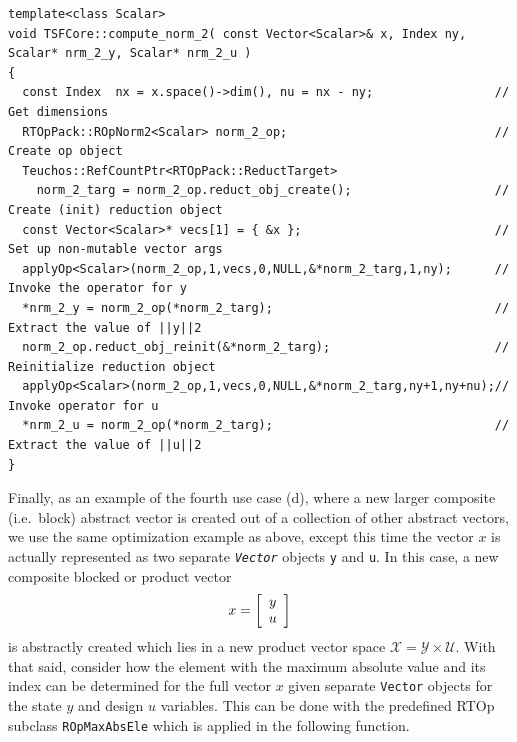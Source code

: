 {\scriptsize\begin{verbatim}
template<class Scalar>
void TSFCore::compute_norm_2( const Vector<Scalar>& x, Index ny, Scalar* nrm_2_y, Scalar* nrm_2_u )
{
  const Index  nx = x.space()->dim(), nu = nx - ny;                 // Get dimensions
  RTOpPack::ROpNorm2<Scalar> norm_2_op;                             // Create op object
  Teuchos::RefCountPtr<RTOpPack::ReductTarget>
    norm_2_targ = norm_2_op.reduct_obj_create();                    // Create (init) reduction object
  const Vector<Scalar>* vecs[1] = { &x };                           // Set up non-mutable vector args
  applyOp<Scalar>(norm_2_op,1,vecs,0,NULL,&*norm_2_targ,1,ny);      // Invoke the operator for y
  *nrm_2_y = norm_2_op(*norm_2_targ);                               // Extract the value of ||y||2
  norm_2_op.reduct_obj_reinit(&*norm_2_targ);                       // Reinitialize reduction object
  applyOp<Scalar>(norm_2_op,1,vecs,0,NULL,&*norm_2_targ,ny+1,ny+nu);// Invoke operator for u
  *nrm_2_u = norm_2_op(*norm_2_targ);                               // Extract the value of ||u||2
}
\end{verbatim}}

{}\noindent{}Finally, as an example of the fourth use case (d), where a new larger
composite (i.e.~block) abstract vector is created out of a collection
of other abstract vectors, we use the same optimization example as
above, except this time the vector $x$ is actually represented as two
separate \texttt{\textit{Vector}} objects \texttt{y} and \texttt{u}.
In this case, a new composite blocked or product vector
%
\[
x = {\bmat{c} y \\ u \emat}
\]
%
is abstractly created which lies in a new product vector space
$\mathcal{X} = \mathcal{Y} \times \mathcal{U}$.  With that said,
consider how the element with the maximum absolute value and its index
can be determined for the full vector $x$ given separate
\texttt{Vector} objects for the state $y$ and design $u$ variables.
This can be done with the predefined RTOp subclass
\texttt{ROpMax\-AbsEle} which is applied in the following
function.

